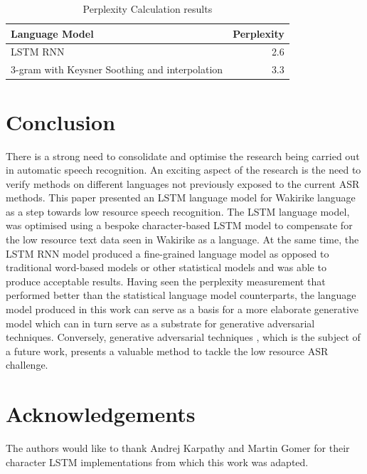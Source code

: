 \documentclass[a4paper]{article}
\begin{document}
\begin{table}
  \caption{Perplexity Calculation results}
  \label{tab:example}
\begin{tabular}{lr}
\toprule
Language Model & Perplexity\\
\midrule
LSTM RNN & 2.6\\
3-gram with Keysner Soothing and interpolation & 3.3\\
\bottomrule
\end{tabular}
\end{table}

\section{Conclusion}
There is a strong need to consolidate and optimise the research being carried out in automatic speech recognition.  An exciting aspect of the research is the need to verify methods on different languages not previously exposed to the current ASR methods.  This paper presented an LSTM language model for Wakirike language as a step towards low resource speech recognition.  The LSTM language model, was optimised using a bespoke character-based LSTM model to compensate for the low resource text data seen in Wakirike as a language. At the same time, the LSTM RNN model produced a fine-grained language model as opposed to traditional word-based models or other statistical models and was able to produce acceptable results. Having seen the perplexity measurement that performed better than the statistical language model counterparts, the language model produced in this work can serve as a basis for a more elaborate generative model which can in turn serve as a substrate for generative adversarial techniques. Conversely, generative adversarial techniques \cite{goodfellow2014generative}, which is the subject of a future work, presents a valuable method to tackle the low resource ASR challenge.

\section{Acknowledgements}

The authors would like to thank Andrej Karpathy and Martin Gomer for their character LSTM implementations from which this work was adapted.





\end{document}
